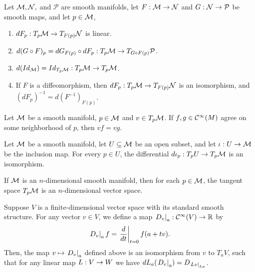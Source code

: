 \documentclass[11pt,a4paper]{article}
\begin{document}
\begin{proposition}
Let $\mathcal{M}, \mathcal{N},$ and $\mathcal{P}$ are smooth manifolds, let $F:\mathcal{M}\rightarrow \mathcal{N}$ and $G:\mathcal{N}\rightarrow \mathcal{P}$ be smooth maps, and let $p\in\mathcal{M}$,
\begin{enumerate}
    \item $dF_p:T_p\mathcal{M}\rightarrow T_{F(p)}\mathcal{N}$ is linear.
    \item $d(G\circ F)_p = dG_{F(p)}\circ dF_p:T_p\mathcal{M}\rightarrow T_{G\circ F(p)}\mathcal{P}$.
    \item $d(Id_{\mathcal{M}}) = Id_{T_p\mathcal{M}}:T_p\mathcal{M}\rightarrow T_p\mathcal{M}$.
    \item If $F$ is a diffeomorphism, then $dF_p:T_p\mathcal{M}\rightarrow T_{F(p)}\mathcal{N}$ is an isomorphism, and $(dF_p)^{-1} = d(F^{-1})_{F(p)}$.
\end{enumerate}
\end{proposition}

\begin{proposition}
Let $\mathcal{M}$ be a smooth manifold, $p \in \mathcal{M}$ and $v\in T_p\mathcal{M}$. If $f, g \in \mathcal{C}^\infty(M)$ agree on some neighborhood of $p$, then $vf = vg$.
\end{proposition}

\begin{proposition}
Let $\mathcal{M}$ be a smooth manifold, let $U\subseteq \mathcal{M}$ be an open subset, and let $\iota:U\rightarrow \mathcal{M}$ be the inclusion map. For every $p \in U$, the differential $d\iota_p:T_pU\rightarrow T_p\mathcal{M}$ is an isomorphism.
\end{proposition}

\begin{proposition}
If $\mathcal{M}$ is an $n$-dimensional smooth manifold, then for each $p \in \mathcal{M}$, the tangent space $T_p\mathcal{M}$ is an $n$-dimensional vector space.
\end{proposition}

\begin{proposition}
Suppose $V$ is a finite-dimensional vector space with its standard smooth structure. For any vector $v\in V$, we define a  map $\left.D_v\right|_{a}:\mathcal{C}^\infty(V)\rightarrow \mathbb{R}$ by 
\begin{equation*}
    \left.D_v\right|_{a} f = \left.\dfrac{d}{dt}\right|_{t=0} f(a+tv).
\end{equation*}
Then, the map $v\mapsto \left.D_v\right|_{a}$ defined above is an isomorphism from $v$ to $T_aV$, such that for any linear map $L:V\rightarrow W$ we have $dL_a(\left.D_v\right|_{a}) = D_{\left.Lv\right|_{La}}$.
\end{proposition}
\end{document}
